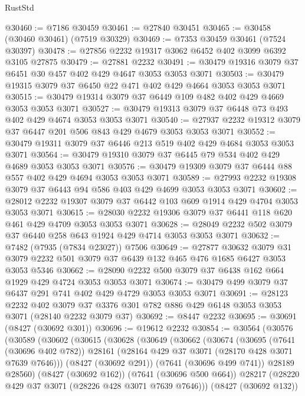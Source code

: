 \begin{lexlean}{RustStd}
\begin{coremodule}
{\begin{coremodule}
{{{{{{{{{{{{{{{{{{{{{{{{{{{{{{{{@30460 := @7186 @30459
@30461 := @27840 @30451
@30465 := @30458 (@30460 @30461) (@7519 @30329)
@30469 := @7353 @30459 @30461 (@7524 @30397)
@30478 := @27856 @2232 @19317 @3062 @6452 @402 @3099 @6392 @3105 @27875
@30479 := @27881 @2232
@30491 := @30479 @19316 @3079 @37 @6451 @30 @457 @402 @429 @4647 @3053 @3053 @3071
@30503 := @30479 @19315 @3079 @37 @6450 @22 @471 @402 @429 @4664 @3053 @3053 @3071
@30515 := @30479 @19314 @3079 @37 @6449 @109 @482 @402 @429 @4669 @3053 @3053 @3071
@30527 := @30479 @19313 @3079 @37 @6448 @73 @493 @402 @429 @4674 @3053 @3053 @3071
@30540 := @27937 @2232 @19312 @3079 @37 @6447 @201 @506 @843 @429 @4679 @3053 @3053 @3071
@30552 := @30479 @19311 @3079 @37 @6446 @213 @519 @402 @429 @4684 @3053 @3053 @3071
@30564 := @30479 @19310 @3079 @37 @6445 @79 @534 @402 @429 @4689 @3053 @3053 @3071
@30576 := @30479 @19309 @3079 @37 @6444 @88 @557 @402 @429 @4694 @3053 @3053 @3071
@30589 := @27993 @2232 @19308 @3079 @37 @6443 @94 @586 @403 @429 @4699 @3053 @3053 @3071
@30602 := @28012 @2232 @19307 @3079 @37 @6442 @103 @609 @1914 @429 @4704 @3053 @3053 @3071
@30615 := @28030 @2232 @19306 @3079 @37 @6441 @118 @620 @461 @429 @4709 @3053 @3053 @3071
@30628 := @28049 @2232 @502 @3079 @37 @6440 @258 @643 @1924 @429 @4714 @3053 @3053 @3071
@30632 := @7482 (@7935 (@7834 @23027)) @7506
@30649 := @27877
    @30632
    @3079
    @31
    @3079
    @2232
    @501
    @3079
    @37
    @6439
    @132
    @465
    @476
    @1685
    @6427
    @3053
    @3053
    @5346
@30662 := @28090 @2232 @500 @3079 @37 @6438 @162 @664 @1929 @429 @4724 @3053 @3053 @3071
@30674 := @30479 @499 @3079 @37 @6437 @291 @741 @402 @429 @4729 @3053 @3053 @3071
@30691 := @28123
    @2232
    @402
    @3079
    @37
    @3376
    @301
    @782
    @886
    @429
    @6148
    @3053
    @3053
    @3071
    (@28140 @2232 @3079 @37)
@30692 := @8447 @2232
@30695 := @30691 (@8427 (@30692 @301))
@30696 := @19612 @2232
@30854 := @30564
    (@30576
      (@30589
        (@30602
          (@30615
            (@30628
              (@30649
                (@30662
                  (@30674
                    (@30695
                      (@7641 (@30696 @402 @782))
                      @28161
                      (@28164 @429 @37 @3071 (@28170 @428 @3071 @7639 @7646)))
                    (@8427 (@30692 @291))
                    (@7641 (@30696 @499 @741))
                    @28189
                    @28560)
                  (@8427 (@30692 @162))
                  (@7641 (@30696 @500 @664))
                  @28217
                  (@28220 @429 @37 @3071 (@28226 @428 @3071 @7639 @7646)))
                (@8427 (@30692 @132))
}}}}}}}}}}}}}}}}}}}}}}}}}}}}}}}}
\end{coremodule}}
\end{coremodule}
\end{lexlean}
